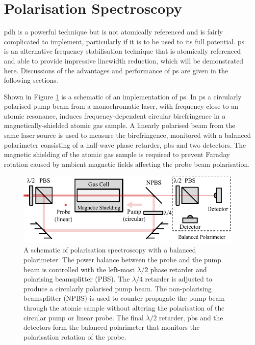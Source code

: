 \section{Polarisation Spectroscopy}%
\label{section:pol_spec_theory}

\Gls{pdh} is a powerful technique but is not atomically referenced and is fairly complicated to implement, particularly if it is to be used to its full potential.
\Gls{ps} is an alternative frequency stabilisation technique that is atomically referenced and able to provide impressive linewidth reduction, which will be demonstrated here.
Discussions of the advantages and performance of \gls{ps} are given in the following sections.

Shown in Figure \ref{figure:pol_spec_schematic} is a schematic of an implementation of \gls{ps}.
In \gls{ps} a circularly polarised pump beam from a monochromatic laser, with frequency close to an atomic resonance, induces frequency-dependent circular birefringence in a magnetically-shielded atomic gas sample.
A linearly polarised beam from the same laser source is used to measure the birefringence, monitored with a balanced polarimeter consisting of a half-wave phase retarder, \gls{pbs} and two detectors.
The magnetic shielding of the atomic gas sample is required to prevent Faraday rotation caused by ambient magnetic fields affecting the probe beam polarisation.

\begin{figure}
\centering
\includegraphics{part1/Figs/PolSpecSchematic.pdf}
\caption[Polarisation spectroscopy setup.]{A schematic of polarisation spectroscopy with a balanced polarimeter.
The power balance between the probe and the pump beam is controlled with the left-most $\lambda/2$ phase retarder and polarising beamsplitter (PBS).
The $\lambda/4$ retarder is adjusted to produce a circularly polarised pump beam.
The non-polarising beamsplitter (NPBS) is used to counter-propagate the pump beam through the atomic sample without altering the polarisation of the circular pump or linear probe.
The final $\lambda/2$ retarder, \gls{pbs} and the detectors form the balanced polarimeter that monitors the polarisation rotation of the probe.}
\label{figure:pol_spec_schematic}
\end{figure}


